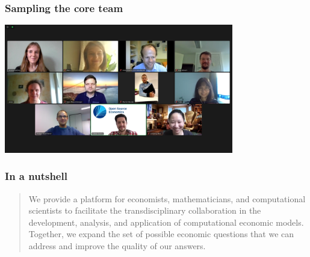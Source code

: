 
\begin{frame}\frametitle{Sampling the core team}\vspace{0.3cm}

\centering
\includegraphics[width=0.75\textwidth]{material/crop-zoom-meeting.png}\\

\end{frame}

\begin{frame}\frametitle{In a nutshell}
\hspace{1.5cm}
\vspace{0.25cm}

\begin{quote}
	\large
	\raggedright
	\linespread{1.3}\selectfont{}
	We provide a platform for economists, mathematicians, and computational scientists to facilitate the \alert{transdisciplinary collaboration} in the development, analysis, and application of \alert{computational economic models}.
	\medskip \\
	Together, we \alert{expand the set} of possible economic questions that we can address and \alert{improve the quality} of our answers.
\end{quote}

\end{frame}

